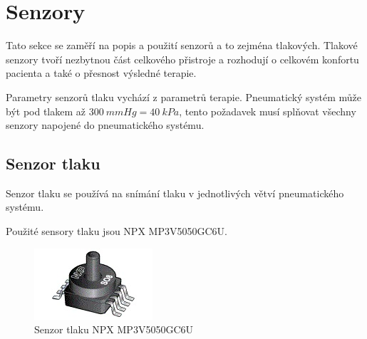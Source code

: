 \section{Senzory}
Tato sekce se zaměří na popis a použití senzorů a to zejména tlakových. Tlakové senzory tvoří nezbytnou část celkového přistroje a rozhodují o celkovém konfortu pacienta a také o přesnost výsledné terapie. \par
Parametry senzorů tlaku vychází z parametrů terapie. Pneumatický systém může být pod tlakem až $300 \ mmHg = 40 \ kPa$, tento požadavek musí splňovat všechny senzory napojené do pneumatického systému.

\subsection{Senzor tlaku} \label{section:pressure_sen}
Senzor tlaku se používá na snímání tlaku v jednotlivých větví pneumatického systému. \par


Použité sensory tlaku jsou NPX MP3V5050GC6U.

\begin{figure}[H]
    \centering
    \includegraphics[width=0.5\linewidth]{pictures/nxp_sensor.jpg}
    \caption{Senzor tlaku NPX MP3V5050GC6U}
    \label{fig:nxp}
\end{figure}

